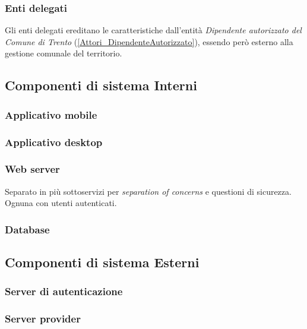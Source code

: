 \documentclass{article}
\begin{document}
\subsubsection{Enti delegati}
Gli enti delegati ereditano le caratteristiche dall'entità \textit{Dipendente autorizzato del Comune di Trento} (\ref{Attori_DipendenteAutorizzato}), essendo però esterno alla gestione comunale del territorio.

\subsection{Componenti di sistema Interni}
\subsubsection{Applicativo mobile}

\subsubsection{Applicativo desktop}

\subsubsection{Web server}

Separato in più sottoservizi per \textit{separation of concerns} e questioni di sicurezza.\\
Ognuna con utenti autenticati.

\subsubsection{Database}

\subsection{Componenti di sistema Esterni}

\subsubsection{Server di autenticazione}

\subsubsection{Server provider}
\end{document}

